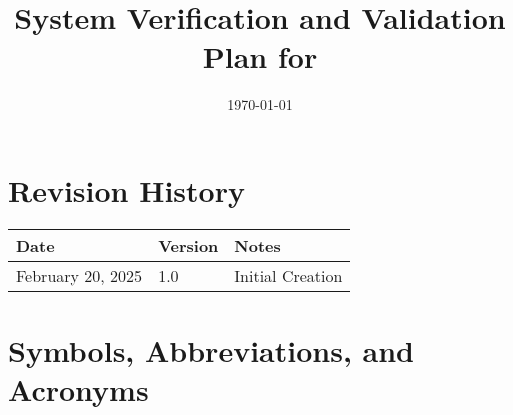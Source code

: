 \documentclass[12pt, titlepage]{article}
\begin{document}
\title{System Verification and Validation Plan for \progname{}} 
\author{\authname}
\date{\today}
	
\maketitle


\section*{Revision History}

\begin{tabularx}{\textwidth}{p{4cm}p{2cm}X}
\toprule {\bf Date} & {\bf Version} & {\bf Notes}\\
\midrule
February 20, 2025 & 1.0 & Initial Creation\\
\bottomrule
\end{tabularx}



\newpage

\tableofcontents

\listoftables


\newpage

\section{Symbols, Abbreviations, and Acronyms}
\end{document}
